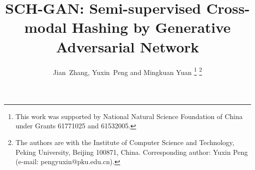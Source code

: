 \documentclass[journal]{IEEEtran}
\begin{document}
%
\title{SCH-GAN: Semi-supervised Cross-modal Hashing by Generative Adversarial Network}
%
%
%

\author{Jian~Zhang, Yuxin~Peng and Mingkuan Yuan
\thanks{This work was supported by National Natural Science Foundation of China
	under Grants 61771025 and 61532005.}
\thanks{The authors are with the Institute of Computer Science and Technology,
	Peking University, Beijing 100871, China. Corresponding author: Yuxin Peng
	(e-mail: pengyuxin@pku.edu.cn).}}

% 
%



% 
\end{document}
